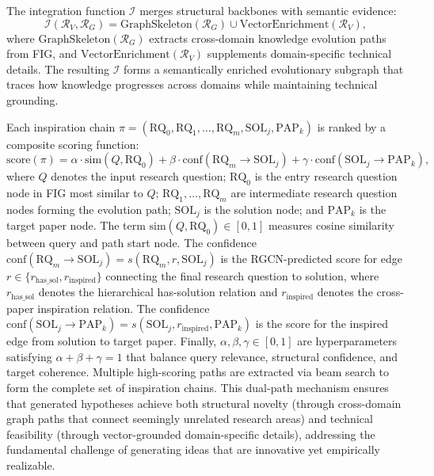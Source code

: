 \documentclass[runningheads]{llncs}
\begin{document}
The integration function $\mathcal{I}$ merges structural backbones with semantic evidence:
\begin{equation}
    \mathcal{I}(\mathcal{R}_V, \mathcal{R}_G) = \text{GraphSkeleton}(\mathcal{R}_G) \cup \text{VectorEnrichment}(\mathcal{R}_V),
\end{equation}
where $\text{GraphSkeleton}(\mathcal{R}_G)$ extracts cross-domain knowledge evolution paths from FIG, and $\text{VectorEnrichment}(\mathcal{R}_V)$ supplements domain-specific technical details. The resulting $\mathcal{I}$ forms a semantically enriched evolutionary subgraph that traces how knowledge progresses across domains while maintaining technical grounding.

Each inspiration chain $\pi = (\text{RQ}_0, \text{RQ}_1, \ldots, \text{RQ}_m, \text{SOL}_j, \text{PAP}_k)$ is ranked by a composite scoring function:
\begin{equation}
    \text{score}(\pi) = \alpha \cdot \text{sim}(Q, \text{RQ}_0) + \beta \cdot \text{conf}(\text{RQ}_m \rightarrow \text{SOL}_j) + \gamma \cdot \text{conf}(\text{SOL}_j \rightarrow \text{PAP}_k),
    \label{eq:score}
\end{equation}
where $Q$ denotes the input research question; $\text{RQ}_0$ is the entry research question node in FIG most similar to $Q$; $\text{RQ}_1, \ldots, \text{RQ}_m$ are intermediate research question nodes forming the evolution path; $\text{SOL}_j$ is the solution node; and $\text{PAP}_k$ is the target paper node. The term $\text{sim}(Q, \text{RQ}_0) \in [0, 1]$ measures cosine similarity between query and path start node. The confidence $\text{conf}(\text{RQ}_m \rightarrow \text{SOL}_j) = s(\text{RQ}_m, r, \text{SOL}_j)$ is the RGCN-predicted score for edge $r \in \{r_{\text{has\_sol}}, r_{\text{inspired}}\}$ connecting the final research question to solution, where $r_{\text{has\_sol}}$ denotes the hierarchical has-solution relation and $r_{\text{inspired}}$ denotes the cross-paper inspiration relation. The confidence $\text{conf}(\text{SOL}_j \rightarrow \text{PAP}_k) = s(\text{SOL}_j, r_{\text{inspired}}, \text{PAP}_k)$ is the score for the inspired edge from solution to target paper. Finally, $\alpha, \beta, \gamma \in [0, 1]$ are hyperparameters satisfying $\alpha + \beta + \gamma = 1$ that balance query relevance, structural confidence, and target coherence. Multiple high-scoring paths are extracted via beam search to form the complete set of inspiration chains. This dual-path mechanism ensures that generated hypotheses achieve both structural novelty (through cross-domain graph paths that connect seemingly unrelated research areas) and technical feasibility (through vector-grounded domain-specific details), addressing the fundamental challenge of generating ideas that are innovative yet empirically realizable.
\end{document}
